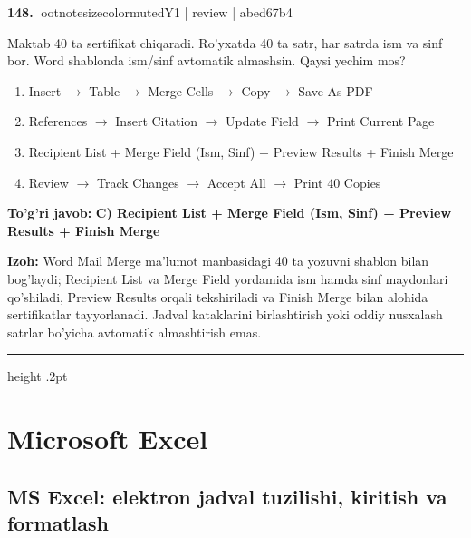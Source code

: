 \documentclass[10pt,a4paper]{article}
\begin{document}
\textbf{\color{ink}148.} {ootnotesizecolor{muted}Y1 | review | abed67b4}
\par
Maktab 40 ta sertifikat chiqaradi. Ro'yxatda 40 ta satr, har satrda ism va sinf bor. Word shablonda ism/sinf avtomatik almashsin. Qaysi yechim mos?
\begin{enumerate}[label=\Alph*),leftmargin=9mm]
\item Insert \ensuremath{\rightarrow} Table \ensuremath{\rightarrow} Merge Cells \ensuremath{\rightarrow} Copy \ensuremath{\rightarrow} Save As PDF
\item References \ensuremath{\rightarrow} Insert Citation \ensuremath{\rightarrow} Update Field \ensuremath{\rightarrow} Print Current Page
\item Recipient List + Merge Field (Ism, Sinf) + Preview Results + Finish Merge
\item Review \ensuremath{\rightarrow} Track Changes \ensuremath{\rightarrow} Accept All \ensuremath{\rightarrow} Print 40 Copies
\end{enumerate}
\begin{tcolorbox}[enhanced,breakable,colback=teal!4,colframe=teal!55!black,boxrule=0.45pt,arc=1.2mm,left=2.8mm,right=2.8mm,top=2mm,bottom=2mm]
\textbf{\color{teal}To'g'ri javob:} \textbf{C) Recipient List + Merge Field (Ism, Sinf) + Preview Results + Finish Merge}
\par\smallskip
\textbf{Izoh:} Word Mail Merge ma'lumot manbasidagi 40 ta yozuvni shablon bilan bog'laydi; Recipient List va Merge Field yordamida ism hamda sinf maydonlari qo'shiladi, Preview Results orqali tekshiriladi va Finish Merge bilan alohida sertifikatlar tayyorlanadi. Jadval kataklarini birlashtirish yoki oddiy nusxalash satrlar bo'yicha avtomatik almashtirish emas.
\end{tcolorbox}
\vspace{2mm}\hrule height .2pt\vspace{2mm}
\section{Microsoft Excel}
\subsection{MS Excel: elektron jadval tuzilishi, kiritish va formatlash}
\end{document}
